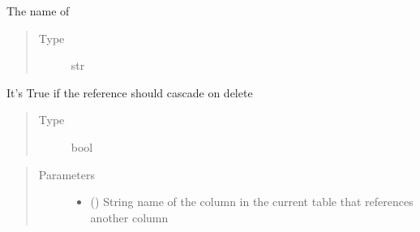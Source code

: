 \documentclass[letterpaper,10pt,english]{sphinxmanual}
\begin{document}
\begin{fulllineitems}
\begin{fulllineitems}
\begin{quote}
\begin{description}
\end{description}\end{quote}

\end{fulllineitems}


\begin{fulllineitems}
\label{\detokenize{model:simple_sql.model.foreign_key.ForeignKey.__to_column_str}}
\sphinxAtStartPar
The name of 
\begin{quote}\begin{description}
\item[{Type}] \leavevmode
\sphinxAtStartPar
str

\end{description}\end{quote}

\end{fulllineitems}


\begin{fulllineitems}
\label{\detokenize{model:simple_sql.model.foreign_key.ForeignKey.__on_delete_cascade}}
\sphinxAtStartPar
It’s True if the reference should cascade on delete
\begin{quote}\begin{description}
\item[{Type}] \leavevmode
\sphinxAtStartPar
bool

\end{description}\end{quote}

\end{fulllineitems}

\begin{quote}\begin{description}
\item[{Parameters}] \leavevmode\begin{itemize}
\item {} 
\sphinxAtStartPar
{} () \textendash{} String name of the column in the current table that references another column


\end{itemize}
\end{description}
\end{quote}
\end{fulllineitems}
\end{document}
